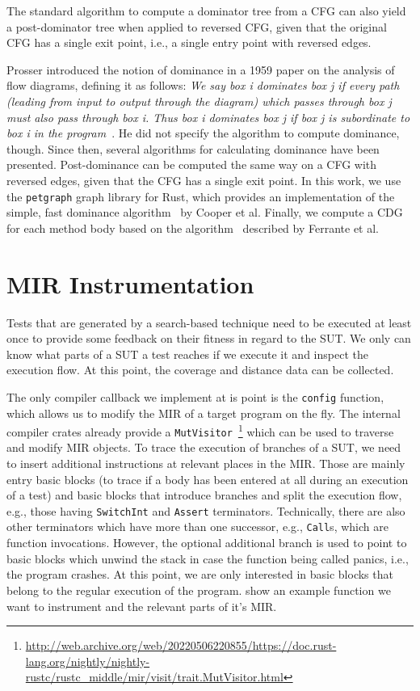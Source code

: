 \documentclass[paper=a4,%
  twoside,%
  BCOR4mm,%
  abstract=true,%
  toc=bibliography,%
  chapterprefix=true,%
  toc=bibliographynumbered,%
  open=right,%
  english,%
  pagesize=pdftex]{scrreprt}
\newcommand{\mir}{\ac{MIR}\xspace}
\newcommand{\cfg}{\ac{CFG}\xspace}
\begin{document}
The standard algorithm to compute a dominator tree from a \cfg can also yield a post-dominator tree when applied to reversed \cfg, given that the original \cfg has a single exit point, i.e., a single entry point with reversed edges.

Prosser introduced the notion of dominance in a 1959 paper on the analysis of flow diagrams, defining it as follows:
\emph{We say box i dominates box j if every path (leading from input to output through the diagram) which passes through box j must also pass through box i. Thus box i dominates box j if box j is subordinate to box i in the program}~\cite{Prosser1959}. He did not specify the algorithm to compute dominance, though. Since then, several algorithms for calculating dominance have been presented. Post-dominance can be computed the same way on a \cfg with reversed edges, given that the \cfg has a single exit point. In this work, we use the \texttt{petgraph} graph library for Rust, which provides an implementation of the simple, fast dominance algorithm~\cite{Cooper2001} by Cooper et al. Finally, we compute a \ac{CDG} for each method body based on the algorithm~\cite{Ferrante1987} described by Ferrante et al.

\section{MIR Instrumentation}
Tests that are generated by a search-based technique need to be executed at least once to provide some feedback on their fitness in regard to the \ac{SUT}. We only can know what parts of a \ac{SUT} a test reaches if we execute it and inspect the execution flow. At this point, the coverage and distance data can be collected. 

The only compiler callback we implement at is point is the \texttt{config} function, which allows us to modify the \mir of a target program on the fly. The internal compiler crates already provide a \texttt{MutVisitor}~\footnote{\url{http://web.archive.org/web/20220506220855/https://doc.rust-lang.org/nightly/nightly-rustc/rustc_middle/mir/visit/trait.MutVisitor.html}} which can be used to traverse and modify \mir objects. To trace the execution of branches of a \ac{SUT}, we need to insert additional instructions at relevant places in the \mir. Those are mainly entry basic blocks (to trace if a body has been entered at all during an execution of a test) and basic blocks that introduce branches and split the execution flow, e.g., those having \texttt{SwitchInt} and \texttt{Assert} terminators. Technically, there are also other terminators which have more than one successor, e.g., \texttt{Call}s, which are function invocations. However, the optional additional branch is used to point to basic blocks which unwind the stack in case the function being called panics, i.e., the program crashes. At this point, we are only interested in basic blocks that belong to the regular execution of the program.  show an example function we want to instrument and the relevant parts of it's \mir.
\end{document}
